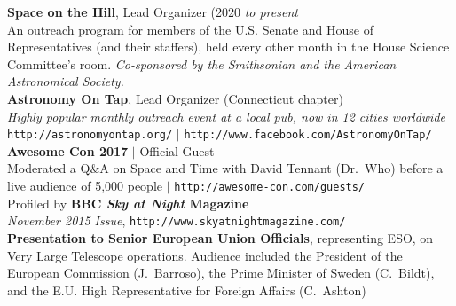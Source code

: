 \documentclass[11pt]{article}
\begin{document}
{%


\textbf{Space on the Hill}, Lead Organizer (2020 \textit{to present} \\
An outreach program for members of the U.S. Senate and House of Representatives (and their staffers), held every other month in the House Science Committee's room. \textit{ Co-sponsored by the Smithsonian and the American Astronomical Society.}\\

\textbf{Astronomy On Tap}, Lead Organizer (Connecticut chapter) \\
\textit{Highly popular monthly outreach event at a local pub, now in 12 cities worldwide} \\
{\footnotesize \texttt{http://astronomyontap.org/}} $|$ {\footnotesize \texttt{http://www.facebook.com/AstronomyOnTap/}} \\


\textbf{Awesome Con 2017} $|$ Official Guest \\
Moderated a Q\&A on Space and Time with David Tennant (Dr.~Who) before a live audience of 5,000 people $|$ \texttt{http://awesome-con.com/guests/}  \\



Profiled by \textbf{BBC \textit{Sky at Night} Magazine} \\ \textit{November 2015 Issue},
{\footnotesize \texttt{http://www.skyatnightmagazine.com/}}\\

\textbf{Presentation to Senior European Union Officials}, representing ESO, on Very Large Telescope operations. Audience included
the President of the European Commission (J.~Barroso), the Prime Minister of Sweden (C.~Bildt), and the
E.U. High Representative for Foreign Affairs (C.~Ashton) \\ }
\end{document}
